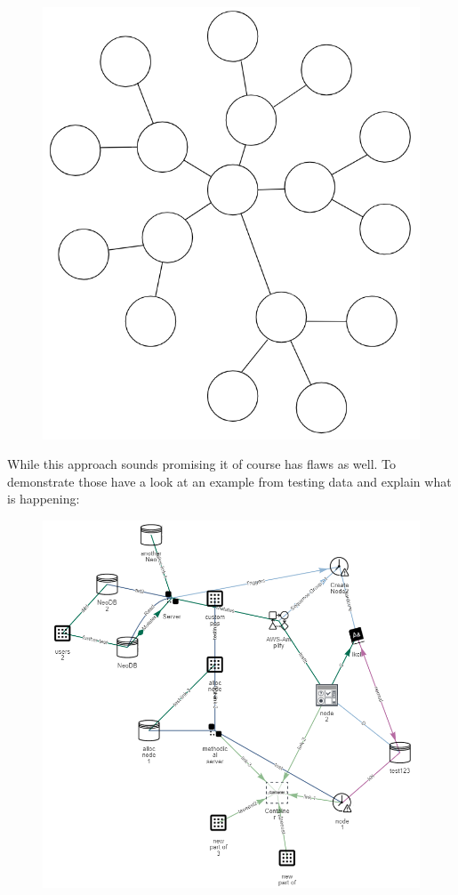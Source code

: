 \begin{figure}[H]
\centering
\includegraphics[scale=.4]{Bilder/FlowerDistEx.png}
\end{figure}

While this approach sounds promising it of course has flaws as well. To demonstrate those have a look at an example from testing data and explain what is happening:

\begin{figure}[H]
\label{ex:TreeBad}
\centering
\includegraphics[scale=.55]{Bilder/FlowerExBad.png}
\end{figure}


